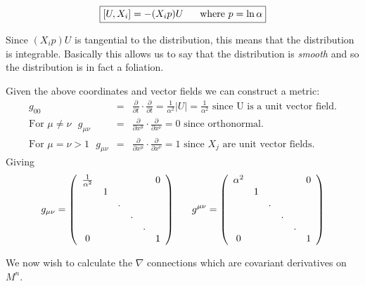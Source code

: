 \begin{equation}
\framebox{$[U,X_i] = -(X_i p)U$ \ \ \ \ where $p = \ln \alpha$} 
\label{IntUXi}
\end{equation}

Since $(X_ip)U$ is tangential to the distribution, this means that the distribution is integrable. Basically this allows us to say that the distribution is \emph{smooth} and so the distribution is in fact a foliation.

Given the above coordinates and vector fields we can construct a metric:
\begin{eqnarray}
\nonumber
g_{00}&=&\frac{\partial}{\partial t} \cdot \frac{\partial}{\partial t} = \frac{1}{\alpha^2}|U|= \frac{1}{\alpha^2} \mbox{ since U is a unit vector field.} \\
\nonumber
\mbox{For $\mu \neq \nu$ } g_{\mu \nu}&=&\frac{\partial}{\partial x^\mu} \cdot \frac{\partial}{\partial x^\nu} = 0 \mbox{ since orthonormal.} \\
\nonumber
\mbox{For $\mu=\nu > 1$ } g_{\mu \nu}&=&\frac{\partial}{\partial x^\mu} \cdot \frac{\partial}{\partial x^\nu} = 1 \mbox{ since $X_j$ are unit vector fields.}
\end{eqnarray}
Giving
\begin{displaymath}
g_{\mu \nu} = 
\left(\begin{array}{clrrrr}      
\frac{1}{\alpha^2} &   &  &  &  & 0\\       
  								 & 1 &   & & &  \\ 
  								 &   & . &  & &  \\ 
  								 &   &   & . &  &  \\ 
  								 &   &   &   & . &  \\ 
  		0						 &  &  & & & 1  
\end{array}\right)
\mbox{\, \, \, \,} g^{\mu \nu} = 
\left(\begin{array}{clrrrr}      
\alpha^2 &   &  &  &  & 0\\       
  								 & 1 &   & & &  \\ 
  								 &   & . &  & &  \\ 
  								 &   &   & . &  &  \\ 
  								 &   &   &   & . &  \\ 
  		0						 &  &  & & & 1  
\end{array}\right)
\end{displaymath}

We now wish to calculate the $\nabla$ connections which are covariant derivatives on $M^n$.

